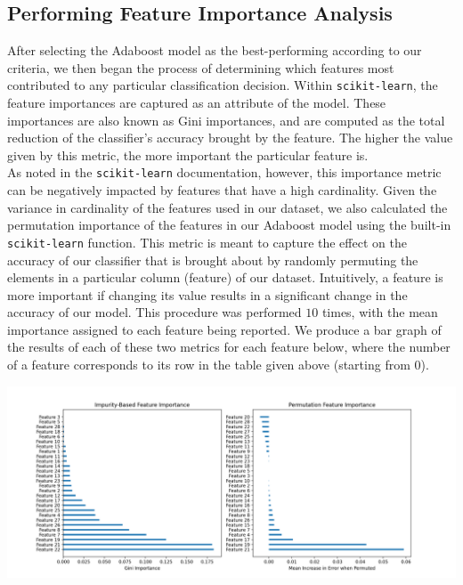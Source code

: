 \documentclass[conference]{IEEEtran}
\begin{document}
\subsection{Performing Feature Importance Analysis}

After selecting the Adaboost model as the best-performing according to our criteria, we then began the process of determining which features most contributed to any particular classification decision. Within \texttt{scikit-learn}, the feature importances are captured as an attribute of the model. These importances are also known as Gini importances, and 
are computed as the total reduction of the classifier's accuracy brought by the feature. The higher the value given by this metric, the more important the particular feature is.\\

As noted in the \texttt{scikit-learn} documentation, however, this importance metric can be negatively impacted by features that have a high cardinality. Given the variance in cardinality of the features used in our dataset, we also calculated the permutation importance of the features in our Adaboost model using the built-in \texttt{scikit-learn} function. This metric is meant to capture the effect on the accuracy of our classifier that is brought about by randomly permuting the elements in a particular column (feature) of our dataset. Intuitively, a feature is more important if changing its value results in a significant change in the accuracy of our model. This procedure was performed $10$ times, with the mean importance assigned to each feature being reported. We produce a bar graph of the results of each of these two metrics for each feature below, where the number of a feature corresponds to its row in the table given above (starting from 0). \\

\begin{center}
\includegraphics[scale=0.28]{Feature_Importances.png}
\end{center}
\end{document}
